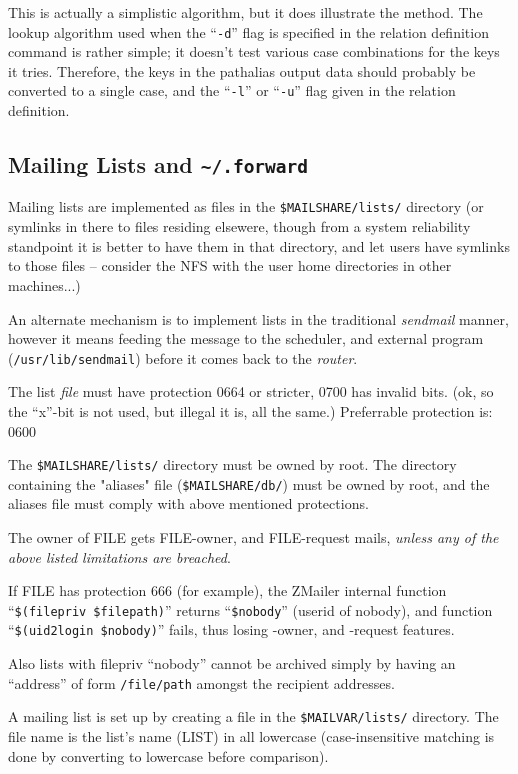 This is actually a simplistic algorithm, but it does illustrate the method.
The lookup algorithm used when the ``{\tt -d}'' flag is specified in the
relation definition command is rather simple; it doesn't test various case
combinations for the keys it tries.  Therefore, the keys in the pathalias
output data should probably be converted to a single case, and the ``{\tt -l}''
or ``{\tt -u}'' flag given in the relation definition.



\subsection{Mailing Lists and {\tt\~{}/.forward}}%
\label{mailing_list_maintenance}


Mailing lists are implemented as files in the {\tt \$MAILSHARE/lists/} 
directory (or symlinks in there to files residing elsewere, though from a system
reliability standpoint it is better to have them in that directory,
and let users have symlinks to those files -- consider the NFS
with the user home directories in other machines...)

An alternate mechanism is to implement lists in the traditional {\em sendmail}
manner, however it means feeding the message to the scheduler, and
external program ({\tt /usr/lib/sendmail}) before it comes back to the
{\em router}.

The list {\em file} must have protection 0664 or stricter, 0700 has
invalid bits.
(ok, so the ``x''-bit is not used, but illegal it is, all the same.)
Preferrable protection is: 0600

The {\tt \$MAILSHARE/lists/} directory must be owned by root.
The directory containing the "aliases" file  ({\tt \$MAILSHARE/db/}) 
must be owned by root, and the aliases file must comply with above mentioned 
protections.

The owner of FILE gets FILE-owner, and FILE-request mails,
{\em unless any of the above listed limitations are breached}.

If FILE has protection 666 (for example), the ZMailer internal function
``{\tt \$(filepriv \$filepath)}''
returns ``{\tt \$nobody}'' (userid of nobody), and  function
``{\tt \$(uid2login \$nobody)}'' fails, thus losing -owner, and 
-request features.

Also lists with filepriv ``nobody'' cannot be archived simply
by having an ``address'' of form {\tt /file/path} amongst the
recipient addresses.

A mailing list is set up by creating a file in the 
{\tt \$MAILVAR/lists/} directory.
The file name is the list's name (LIST) in all lowercase
(case-insensitive matching is done by converting to lowercase
before comparison).

